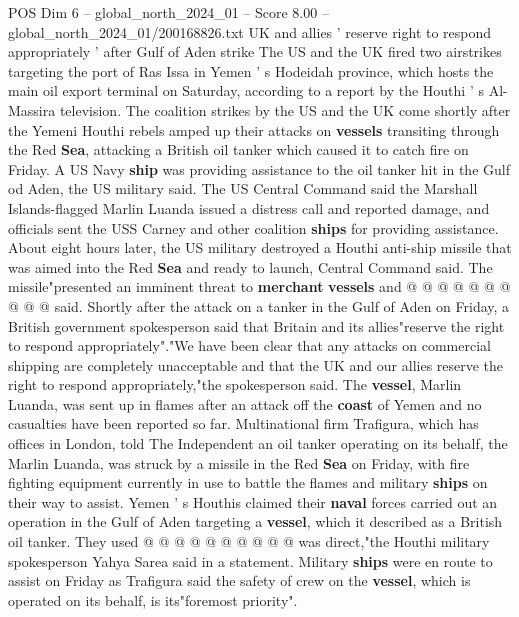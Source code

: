 \begin{textsample}{POS Dim 6 – global\_north\_2024\_01 – Score 8.00 – global\_north\_2024\_01/200168826.txt}  \label{ex:f6_pos_111}
UK and allies ' reserve right to respond appropriately ' after Gulf of Aden strike The US and the UK fired two airstrikes targeting the port of Ras Issa in Yemen ' s Hodeidah province, which hosts the main oil export terminal on Saturday, according to a report by the Houthi ' s Al-Massira television.
The coalition strikes by the US and the UK come shortly after the Yemeni Houthi rebels amped up their attacks on \textbf{vessels} transiting through the Red \textbf{Sea}, attacking a British oil tanker which caused it to catch fire on Friday.
A US Navy \textbf{ship} was providing assistance to the oil tanker hit in the Gulf od Aden, the US military said.
The US Central Command said the Marshall Islands-flagged Marlin Luanda issued a distress call and reported damage, and officials sent the USS Carney and other coalition \textbf{ships} for providing assistance.
About eight hours later, the US military destroyed a Houthi anti-ship missile that was aimed into the Red \textbf{Sea} and ready to launch, Central Command said.
The missile"presented an imminent threat to \textbf{merchant} \textbf{vessels} and @ @ @ @ @ @ @ @ @ @ said.
Shortly after the attack on a tanker in the Gulf of Aden on Friday, a British government spokesperson said that Britain and its allies"reserve the right to respond appropriately"."We have been clear that any attacks on commercial shipping are completely unacceptable and that the UK and our allies reserve the right to respond appropriately,"the spokesperson said.
The \textbf{vessel}, Marlin Luanda, was sent up in flames after an attack off the \textbf{coast} of Yemen and no casualties have been reported so far.
Multinational firm Trafigura, which has offices in London, told The Independent an oil tanker operating on its behalf, the Marlin Luanda, was struck by a missile in the Red \textbf{Sea} on Friday, with fire fighting equipment currently in use to battle the flames and military \textbf{ships} on their way to assist.
Yemen ' s Houthis claimed their \textbf{naval} forces carried out an operation in the Gulf of Aden targeting a \textbf{vessel}, which it described as a British oil tanker.
They used @ @ @ @ @ @ @ @ @ @ was direct,"the Houthi military spokesperson Yahya Sarea said in a statement.
Military \textbf{ships} were en route to assist on Friday as Trafigura said the safety of crew on the \textbf{vessel}, which is operated on its behalf, is its"foremost priority".

\end{textsample}
